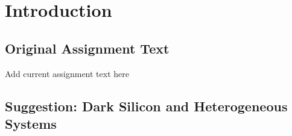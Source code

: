\chapter{Introduction}

\section{Original Assignment Text}

Add current assignment text here

\section{Suggestion: Dark Silicon and Heterogeneous Systems}
